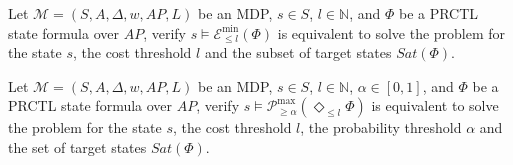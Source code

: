 \begin{remark}
  Let $\mathcal{M} = (S, A, \Delta, w, AP, L)$ be an MDP, $s \in S$, $l \in \mathbb{N}$, and $\Phi$ be a PRCTL state formula over $AP$,
  verify $s \models \mathcal{E}^{\min}_{\leq l}(\Phi)$ is equivalent to solve the \SSPE{} problem for the state $s$, the cost threshold $l$ and the subset of target states $Sat(\Phi)$.
\end{remark}
\begin{remark}
  Let $\mathcal{M} = (S, A, \Delta, w, AP, L)$ be an MDP, $s \in S$, $l \in \mathbb{N}$, $\alpha \in [0, 1]$, and $\Phi$ be a PRCTL state formula over $AP$,
  verify $s \models \mathcal{P}^{\max}_{\geq \alpha}(\Diamond_{\leq l} \Phi)$ is equivalent to solve the \SSPP{} problem for the state $s$, the cost threshold $l$, the probability threshold $\alpha$ and the set of target states $Sat(\Phi)$.
\end{remark}


